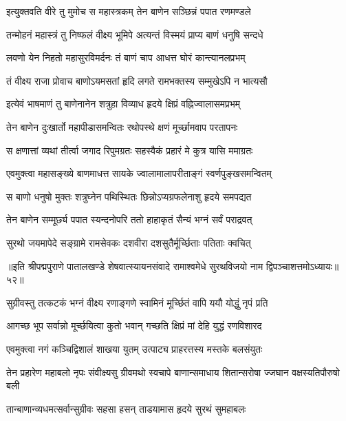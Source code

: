 \twolineshloka
{इत्युक्तवति वीरे तु मुमोच स महास्त्रकम्}
{तेन बाणेन सञ्छिन्नं पपात रणमण्डले}%

\twolineshloka
{तन्मोहनं महास्त्रं तु निष्फलं वीक्ष्य भूमिपे}
{अत्यन्तं विस्मयं प्राप्य बाणं धनुषि सन्दधे}%

\twolineshloka
{लवणो येन निहतो महासुरविमर्दनः}
{तं बाणं चाप आधत्त घोरं कान्त्यानलप्रभम्}%

\twolineshloka
{तं वीक्ष्य राजा प्रोवाच बाणोऽयमसतां हृदि}
{लगते रामभक्तस्य सम्मुखेऽपि न भात्यसौ}%

\twolineshloka
{इत्येवं भाषमाणं तु बाणेनानेन शत्रुहा}
{विव्याध हृदये क्षिप्रं वह्निज्वालासमप्रभम्}%

\twolineshloka
{तेन बाणेन दुःखार्तो महापीडासमन्वितः}
{रथोपस्थे क्षणं मूर्च्छामवाप परतापनः}%

\twolineshloka
{स क्षणात्तां व्यथां तीर्त्वा जगाद रिपुमग्रतः}
{सहस्वैकं प्रहारं मे कुत्र यासि ममाग्रतः}%

\twolineshloka
{एवमुक्त्वा महासङ्ख्ये बाणमाधत्त सायके}
{ज्वालामालापरीताङ्गं स्वर्णपुङ्खसमन्वितम्}%

\twolineshloka
{स बाणो धनुषो मुक्तः शत्रुघ्नेन पथिस्थितः}
{छिन्नोऽप्यग्रफलेनाशु हृदये समपद्यत}%

\twolineshloka
{तेन बाणेन सम्मूर्छ्य पपात स्यन्दनोपरि}
{ततो हाहाकृतं सैन्यं भग्नं सर्वं पराद्रवत्}%

\twolineshloka
{सुरथो जयमापेदे सङ्ग्रामे रामसेवकः}
{दशवीरा दशसुतैर्मूर्च्छिताः पतिताः क्वचित्}%

{॥इति श्रीपद्मपुराणे पातालखण्डे शेषवात्स्यायनसंवादे रामाश्वमेधे सुरथविजयो नाम द्विपञ्चाशत्तमोऽध्यायः॥५२॥}



\twolineshloka
{सुग्रीवस्तु तत्कटकं भग्नं वीक्ष्य रणाङ्गणे}
{स्वामिनं मूर्च्छितं वापि ययौ योद्धुं नृपं प्रति}%

\twolineshloka
{आगच्छ भूप सर्वान्नो मूर्च्छयित्वा कुतो भवान्}
{गच्छति क्षिप्रं मां देहि युद्धं रणविशारद}%

\twolineshloka
{एवमुक्त्वा नगं कञ्चिद्विशालं शाखया युतम्}
{उत्पाट्य प्राहरत्तस्य मस्तके बलसंयुतः}%

\fourlineindentedshloka
{तेन प्रहारेण महाबलो नृपः}
{संवीक्ष्यसु ग्रीवमथो स्वचापे}
{बाणान्समाधाय शितान्सरोषा}
{ज्जघान वक्षस्यतिपौरुषो बली}%

\twolineshloka
{तान्बाणान्व्यधमत्सर्वान्सुग्रीवः सहसा हसन्}
{ताडयामास हृदये सुरथं सुमहाबलः}%

